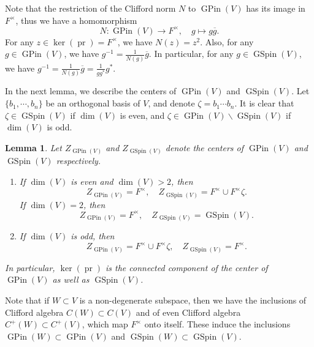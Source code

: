 \documentclass[12pt]{amsart}
\newtheorem{lemma}[theorem]{Lemma}
\theoremstyle{remark}
\newcommand{\pr}{\operatorname{pr}}
\DeclareMathOperator{\GSpin}{GSpin}
\DeclareMathOperator{\GPin}{GPin}
\begin{document}
Note that the restriction of the Clifford norm $N$ to $\GPin(V)$ has its image in $F^\times$, thus we have a homomorphism
\begin{equation*}
N:\GPin(V)\to F^\times , \quad g\mapsto g\overline{g}.	
\end{equation*}
For any $z\in \ker(\pr)=F^\times$, we have $N(z)=z^2$. Also, for any $g\in \GPin(V)$, we have $g^{-1}=\frac{1}{N(g)}\overline{g}$. In particular, for any $g\in \GSpin(V)$, we have $g^{-1}=\frac{1}{N(g)}\overline{g}=\frac{1}{g g^*}g^*$.


In the next lemma, we describe the centers of $\GPin(V)$ and $\GSpin(V)$. 
Let $\{b_1, \cdots, b_n\}$ be an orthogonal basis of $V$, and denote $\zeta=b_1\cdots b_n$. 
It is clear that $\zeta\in \GSpin(V)$ if $\dim(V)$ is even, and $\zeta\in \GPin(V)\backslash  \GSpin(V)$ if $\dim(V)$ is odd. 
 



\begin{lemma}\cite[Theorem 3.6]{Shimura2004}
\label{lemma-center}
Let $Z_{\GPin(V)}$ and $Z_{\GSpin(V)}$ denote the centers of $\GPin(V)$ and $\GSpin(V)$ respectively. 	
\begin{enumerate}
\item If $\dim(V)$ is even and $\dim(V)>2$, then 
\begin{equation*}
Z_{\GPin(V)}=F^\times, \quad Z_{\GSpin(V)}=F^\times \cup F^\times \zeta.	
\end{equation*}
If $\dim(V)=2$, then 
\begin{equation*}
	Z_{\GPin(V)}=F^\times, \quad Z_{\GSpin(V)}=\GSpin(V).
\end{equation*}

\item If $\dim(V)$ is odd, then 
\begin{equation*}
Z_{\GPin(V)}=F^\times \cup F^\times \zeta, \quad Z_{\GSpin(V)}=F^\times. 
\end{equation*}
\end{enumerate}
In particular, $\ker(\pr)$ is the connected component of the center of $\GPin(V)$ as well as $\GSpin(V)$. 
\end{lemma}

Note that if $W\subset V$ is a non-degenerate subspace, then we have the inclusions of Clifford algebra $C(W)\subset C(V)$ and of even Clifford algebra $C^+(W)\subset C^+(V)$, which map $F^\times$ onto itself. These
induce the inclusions
 $\GPin(W)\subset \GPin(V)$ and $\GSpin(W)\subset \GSpin(V)$.
\end{document}
